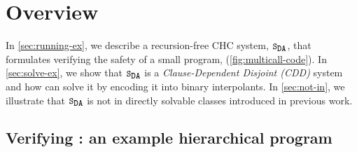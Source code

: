 \section{Overview}
\label{sec:overview}

In \autoref{sec:running-ex}, we describe a recursion-free CHC system,
$\mcchc$, that formulates verifying the safety of a small program,
 (\autoref{fig:multicall-code}).
%
In \autoref{sec:solve-ex}, we show that $\mcchc$ is a
\emph{Clause-Dependent Disjoint (CDD)} system and how \sys can solve it by
encoding it into binary interpolants.
%
In \autoref{sec:not-in}, we illustrate that $\mcchc$ is not in
directly solvable classes introduced in previous work.
%

\subsection{Verifying : an example hierarchical program}
\label{sec:running-ex}

